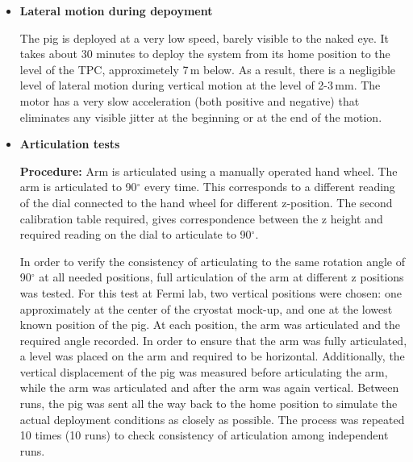 \begin{itemize}
{\bf Results:} The vertical displacement of the pig was found to be extremely consistent, with no apparent
drift due to slippage or any other effect. The average uncertainty of each z coordinate was found to range
between 1-2\,mm, numbers consistent with the uncertainty of the laser ranger and the unevenness of the tape on the bottom of the pig. Fig.~\ref{fig:z_test} shows the correspondence between the z position and stepper motor count exibiting a smooth function with no visible variation of the points from the fit. No measurable slippage of the cables or accumulated offset of the stepper motor count and z position was observed during the repeated tests.

\begin{figure}[htbp]
 \centering
 \texttt{[image: Figs/Z\_positioning\_test]}
 \caption{Plot of the z position of the pig vs the step position of the motor.}
 \label{fig:z_test}
\end{figure}


\item{\bf Lateral motion during depoyment}

The pig is deployed at a very low speed, barely visible to the naked eye. It takes about 30 minutes to deploy the system from its home position to the level of the TPC, approximetely 7\,m below. As a result, there is a negligible level of lateral motion during vertical motion at the level of 2-3\,mm. The motor has a very slow acceleration (both positive and negative) that eliminates any visible jitter at the beginning or at the end of the motion.

\item{\bf Articulation tests}

{\bf Procedure:} Arm is articulated using a manually operated hand wheel.  The arm is articulated to 90$^{\circ}$ every time. This corresponds to a different reading of the dial connected to the hand wheel for different z-position. The second calibration table required, gives correspondence between the z height and required reading on the dial to articulate to 90$^{\circ}$. 

In order to verify the consistency of articulating to the same rotation angle of 90$^{\circ}$ at all needed positions,  full articulation of the arm at different z positions was tested. For this test at Fermi lab, two vertical positions were chosen: one approximately at the center of the cryostat mock-up, and one at the lowest known position of the pig. At each position, the arm was articulated and
the required angle recorded. In order to ensure that the arm was fully articulated, a level was placed on the
arm and required to be horizontal. Additionally, the vertical displacement of the pig was measured before articulating the arm, while the arm was articulated and after the arm was again vertical. Between runs, the
pig was sent all the way back to the home position to simulate the actual deployment conditions as closely as possible. The process was repeated 10 times  (10 runs) to check consistency of articulation among independent runs.


\end{itemize}
